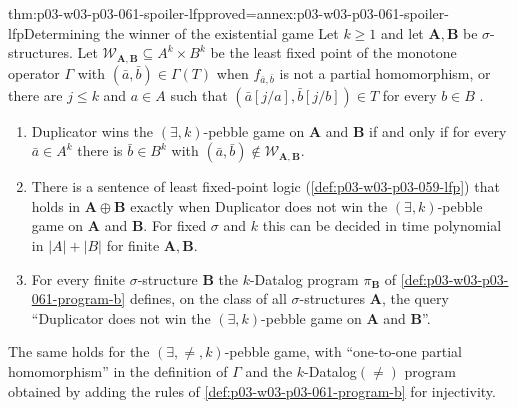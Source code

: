 \begin{hbtheorem}{thm:p03-w03-p03-061-spoiler-lfp}{proved=annex:p03-w03-p03-061-spoiler-lfp}{Determining the winner of the existential game}
Let \(k\ge1\) and let \(\mathbf A,\mathbf B\) be \(\sigma\)-structures. Let
\(\mathcal W_{\mathbf A,\mathbf B}\subseteq A^k\times B^k\) be the least fixed
point of the monotone operator \(\Gamma\) with \((\bar a,\bar b)\in\Gamma(T)\)
when \(f_{\bar a,\bar b}\) is not a partial homomorphism, or there are
\(j\le k\) and \(a\in A\) such that \((\bar a[j/a],\bar b[j/b])\in T\) for
every \(b\in B\) \cite[Thm~8.10, pp.~74--75]{Kolaitis2003ExpressivePowerNotes}.
\begin{enumerate}
\item Duplicator wins the \((\exists,k)\)-pebble game on \(\mathbf A\) and
      \(\mathbf B\) if and only if for every \(\bar a\in A^k\) there is
      \(\bar b\in B^k\) with \((\bar a,\bar b)\notin\mathcal W_{\mathbf
      A,\mathbf B}\).
\item There is a sentence of least fixed-point logic
      (\cref{def:p03-w03-p03-059-lfp}) that holds in \(\mathbf A\oplus\mathbf
      B\) exactly when Duplicator does not win the \((\exists,k)\)-pebble game
      on \(\mathbf A\) and \(\mathbf B\). For fixed \(\sigma\) and \(k\) this
      can be decided in time polynomial in \(|A|+|B|\) for finite
      \(\mathbf A,\mathbf B\).
\item For every finite \(\sigma\)-structure \(\mathbf B\) the \(k\)-Datalog
      program \(\pi_{\mathbf B}\) of \cref{def:p03-w03-p03-061-program-b}
      defines, on the class of all \(\sigma\)-structures \(\mathbf A\), the
      query ``Duplicator does not win the \((\exists,k)\)-pebble game on
      \(\mathbf A\) and \(\mathbf B\)''.
\end{enumerate}
The same holds for the \((\exists,\neq,k)\)-pebble game, with ``one-to-one
partial homomorphism'' in the definition of \(\Gamma\) and the
\(k\)-Datalog\((\neq)\) program obtained by adding the rules of
\cref{def:p03-w03-p03-061-program-b} for injectivity.
\end{hbtheorem}

